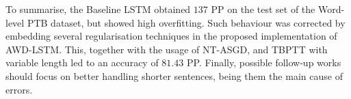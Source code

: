 To summarise, the Baseline LSTM obtained $137$ PP on the test set of the Word-level PTB dataset, but showed high overfitting. Such behaviour was corrected by embedding several regularisation techniques in the proposed implementation of AWD-LSTM. This, together with the usage of NT-ASGD, and TBPTT with variable length led to an accuracy of $81.43$ PP. Finally, possible follow-up works should focus on better handling shorter sentences, being them the main cause of errors.
